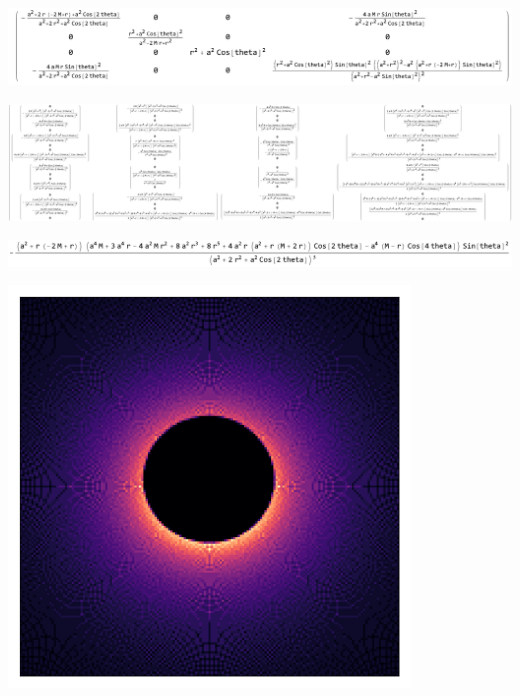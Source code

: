 \documentclass{beamer}
\begin{document}
\begin{frame}{}
    \includegraphics[width=\textwidth]{asset/kerr_metric.png}

\end{frame}


\begin{frame}{}
    \centering

    \includegraphics[width=\textwidth]{asset/christ.png}

\end{frame}


\begin{frame}{}
    \centering

    \includegraphics[width=\textwidth]{asset/christ_detail.png}

\end{frame}


\begin{frame}{}
    \centering

    \includegraphics[width=0.8\textwidth]{asset/bh_0.5_20.png}

\end{frame}
\end{document}

